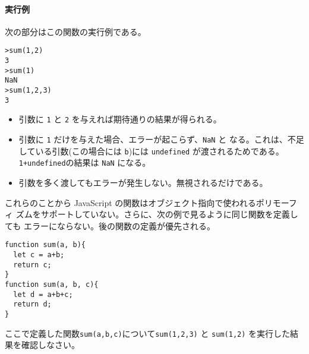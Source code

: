 \paragraph{実行例}
次の部分はこの関数の実行例である。
\begin{Verbatim}
>sum(1,2)
3
>sum(1)
NaN
>sum(1,2,3)
3
\end{Verbatim} 
\begin{itemize}
 \item 引数に \Verb+1+ と \Verb+2+ を与えれば期待通りの結果が得られる。
 \item 引数に \Verb+1+ だけを与えた場合、エラーが起こらず、\Verb+NaN+ と
       なる。これは、不足している引数(この場合には \Verb+b+)には
       \Verb+undefined+ が渡されるためである。\Verb-1+undefined-の結果は
       \Verb+NaN+ になる。
 \item 引数を多く渡してもエラーが発生しない。無視されるだけである。
\end{itemize}
これらのことから JavaScript の関数はオブジェクト指向で使われるポリモーフィ
ズムをサポートしていない。さらに、次の例で見るように同じ関数を定義しても
エラーにならない。後の関数の定義が優先される。
\begin{Verbatim}
function sum(a, b){
  let c = a+b;
  return c;
}
function sum(a, b, c){
  let d = a+b+c;
  return d;
}
\end{Verbatim}
\begin{Prob}\upshape
 ここで定義した関数\texttt{sum(a,b,c)}について\Verb+sum(1,2,3)+ と
 \Verb+sum(1,2)+ を実行した結果を確認しなさい。
\end{Prob}
